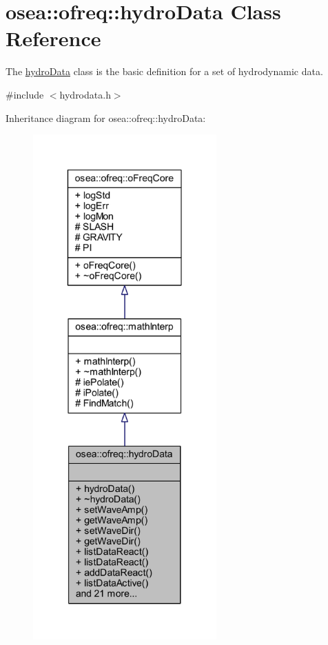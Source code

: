 \hypertarget{classosea_1_1ofreq_1_1hydro_data}{\section{osea\-:\-:ofreq\-:\-:hydro\-Data Class Reference}
\label{classosea_1_1ofreq_1_1hydro_data}
}


The \hyperlink{classosea_1_1ofreq_1_1hydro_data}{hydro\-Data} class is the basic definition for a set of hydrodynamic data.  




{\ttfamily \#include $<$hydrodata.\-h$>$}



Inheritance diagram for osea\-:\-:ofreq\-:\-:hydro\-Data\-:
\nopagebreak
\begin{figure}[H]
\begin{center}
\leavevmode
\includegraphics[height=550pt]{classosea_1_1ofreq_1_1hydro_data__inherit__graph}
\end{center}
\end{figure}
